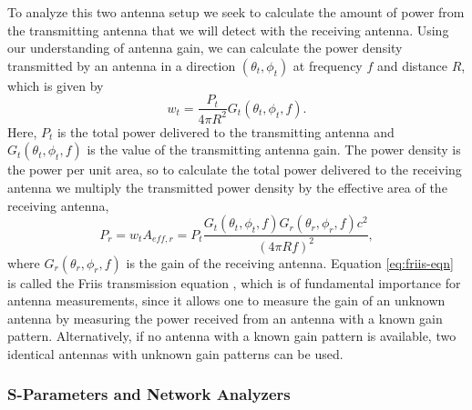 To analyze this two antenna setup we seek to calculate the amount of power from the transmitting antenna that we will detect with the receiving antenna. Using our understanding of antenna gain, we can calculate the power density transmitted by an antenna in a direction $(\theta_t,\phi_t)$ at frequency $f$ and distance $R$, which is given by
\begin{equation}
    w_t = \frac{P_t}{4\pi R^2}G_t(\theta_t,\phi_t,f).
\end{equation}
Here, $P_t$ is the total power delivered to the transmitting antenna and $G_t(\theta_t,\phi_t,f)$ is the value of the transmitting antenna gain. The power density is the power per unit area, so to calculate the total power delivered to the receiving antenna we multiply the transmitted power density by the effective area of the receiving antenna,
\begin{equation}
    P_r = w_tA_{eff,r}=P_t\frac{G_t(\theta_t,\phi_t,f)G_r(\theta_r,\phi_r,f)c^2}{(4\pi Rf)^2},
    \label{eq:friis-eqn}
\end{equation}
where $G_r(\theta_r,\phi_r,f)$ is the gain of the receiving antenna. Equation \ref{eq:friis-eqn} is called the Friis transmission equation \cite{friis_paper,friis_wiki}, which is of fundamental importance for antenna measurements, since it allows one to measure the gain of an unknown antenna by measuring the power received from an antenna with a known gain pattern. Alternatively, if no antenna with a known gain pattern is available, two identical antennas with unknown gain patterns can be used.

\subsubsection{S-Parameters and Network Analyzers}

